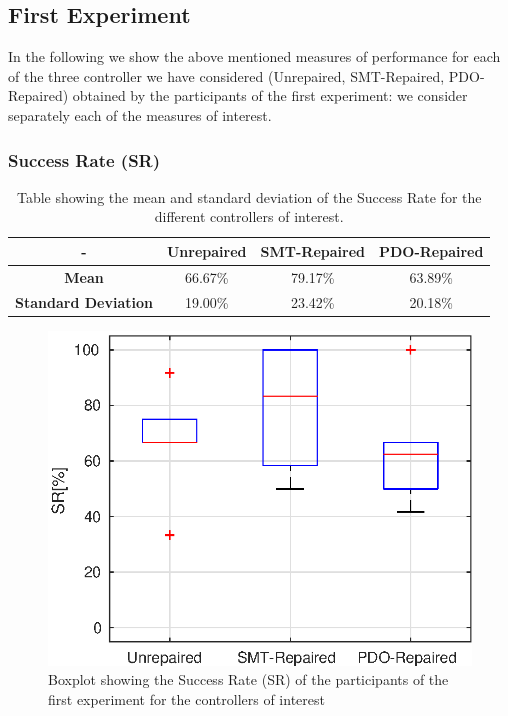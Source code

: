 \subsection{First Experiment}\label{subsec:first-exp}
In the following we show the above mentioned measures of performance for each of the three controller we have considered (Unrepaired, SMT-Repaired, PDO-Repaired) obtained by the participants of the first experiment: we consider separately each of the measures of interest.
%
%
%
%
%
\subsubsection{Success Rate (SR)}\label{subsub:first-SR}
\begin{table}[ht]
    \centering
    \begin{tabular}{|c|c|c|c|}
        \hline
        - & \textbf{Unrepaired} & \textbf{SMT-Repaired} & \textbf{PDO-Repaired} \\
        \hline
        \textbf{Mean} & 66.67\% & 79.17\% & 63.89\% \\
        \textbf{Standard Deviation} & 19.00\% & 23.42\% & 20.18\% \\
        \hline
    \end{tabular}
    \caption{Table showing the mean and standard deviation of the Success Rate for the different controllers of interest.}
    \label{tab:SR-first-mean-std}
\end{table}
\begin{figure}[ht]
    \centering
    \includegraphics[width=\textwidth]{Images/first-experiment/exp0_success_rate}
    \caption{Boxplot showing the Success Rate (SR) of the participants of the first experiment for the controllers of interest}
    \label{fig:box-SR-first}
\end{figure}

